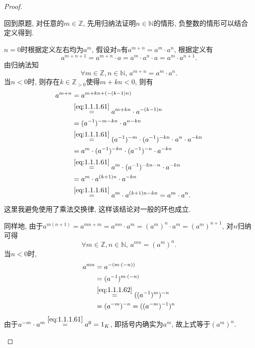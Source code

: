 \begin{proof}
\begin{enumerate}[(1)]
        回到原题, 对任意的$m \in \mathbb{Z}$, 先用归纳法证明$n \in \mathbb{N}$的情形, 负整数的情形可以结合定义得到.
        
        $n = 0$时根据定义左右均为$a^m$, 假设对$n$有$a^{m + n} = a^m \cdot a^n$, 根据定义有
        \[
            a^{m + n + 1} = a^{m + n} \cdot a = a^m \cdot a^n \cdot a = a^m \cdot a^{n + 1}.
        \]
        由归纳法知
        \begin{equation}
            \forall m \in \mathbb{Z}, n \in \mathbb{N} ,\, a^{m + n} = a^m \cdot a^n.
            \tag{*}
            \label{eq:1.1.1.61}
        \end{equation}
        当$n < 0$时, 则存在$k \in \mathbb{Z}_{>0}$使得$m + kn < 0$, 则有
        \[
        \begin{aligned}
            a^{m + n} &= a^{m + kn + (-(k - 1)n)}\\
            &\overset{\eqref{eq:1.1.1.61}}= a^{m + kn} \cdot a^{-(k - 1)n}\\
            &= (a^{-1})^{-m - kn} \cdot a^{n - kn}\\
            &\overset{\eqref{eq:1.1.1.61}}= (a^{-1})^{-m} \cdot (a^{-1})^{-kn} \cdot a^n \cdot a^{-kn}\\
            &= a^m \cdot (a^{-1})^{-kn} \cdot (a^{-1})^{-n} \cdot a^{-kn}\\
            &\overset{\eqref{eq:1.1.1.61}}= a^m \cdot (a^{-1})^{-kn - n} \cdot a^{-kn}\\
            &= a^m \cdot a^{(k + 1)n} \cdot a^{-kn}\\
            &\overset{\eqref{eq:1.1.1.61}}= a^m \cdot a^{(k + 1)n - kn} = a^m \cdot a^n.
        \end{aligned}
        \]
        这里我避免使用了乘法交换律, 这样该结论对一般的环也成立.
        
        同样地, 由于$a^{m(n + 1)} = a^{mn + m} = a^{mn} \cdot a^m = (a^{m})^n \cdot a^m = (a^m)^{n + 1}$, 对$n$归纳可得
        \begin{equation}
            \forall m \in \mathbb{Z}, n \in \mathbb{N},\, a^{mn} = (a^m)^n.
            \tag{**}
            \label{eq:1.1.1.62}
        \end{equation}
        当$n < 0$时,
        \[
        \begin{aligned}
            a^{mn} &= a^{-(m \cdot (-n))}\\
            &= (a^{-1})^{m \cdot (-n)}\\
            &\overset{\eqref{eq:1.1.1.62}}= ((a^{-1})^m)^{-n}\\
            &= (a^{-m})^{-n} = ((a^{-m})^{-1})^n
        \end{aligned}
        \]
        由于$a^{-m} \cdot a^m \overset{\eqref{eq:1.1.1.61}}= a^0 = 1_K$, 即括号内确实为$a^m$, 故上式等于$(a^m)^n$.
    \end{enumerate}
\end{proof}

